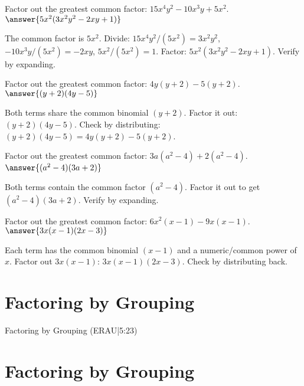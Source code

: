 \documentclass{ximera}
\begin{document}
\begin{problem}
Factor out the greatest common factor: \(15x^4y^2 - 10x^3y + 5x^2\). $\answer{5x^2(3x^2y^2 - 2xy + 1)}$
\begin{feedback}
The common factor is \(5x^2\). Divide: \(15x^4y^2/(5x^2)=3x^2y^2\), \(-10x^3y/(5x^2)=-2xy\), \(5x^2/(5x^2)=1\). Factor: \(5x^2(3x^2y^2-2xy+1)\). Verify by expanding.
\end{feedback}
\end{problem}

\begin{problem}
Factor out the greatest common factor: \(4y(y+2) - 5(y+2)\). $\answer{(y+2)(4y-5)}$
\begin{feedback}
Both terms share the common binomial \((y+2)\). Factor it out: \((y+2)(4y-5)\). Check by distributing: \((y+2)(4y-5)=4y(y+2)-5(y+2)\).
\end{feedback}
\end{problem}

\begin{problem}
Factor out the greatest common factor: \(3a(a^2-4) + 2(a^2-4)\). $\answer{(a^2-4)(3a+2)}$
\begin{feedback}
Both terms contain the common factor \((a^2-4)\). Factor it out to get \((a^2-4)(3a+2)\). Verify by expanding.
\end{feedback}
\end{problem}

\begin{problem}
Factor out the greatest common factor: \(6x^2(x-1) - 9x(x-1)\). $\answer{3x(x-1)(2x-3)}$
\begin{feedback}
Each term has the common binomial \((x-1)\) and a numeric/common power of \(x\). Factor out \(3x(x-1)\): \(3x(x-1)(2x-3)\). Check by distributing back.
\end{feedback}
\end{problem}


\section*{Factoring by Grouping}

Factoring by Grouping (ERAU|5:23)



\section*{Factoring by Grouping}
\end{document}
